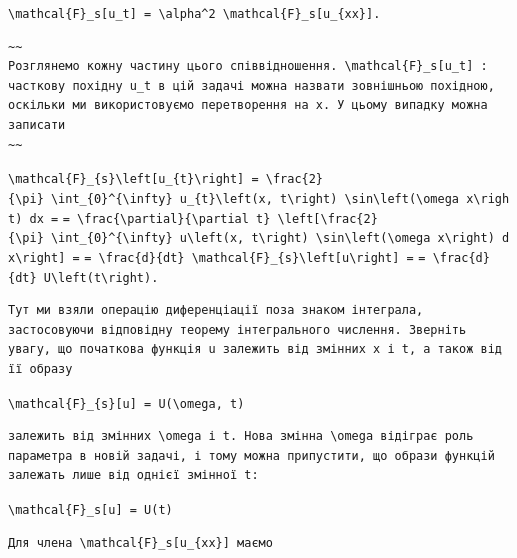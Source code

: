 \documentclass[
  ukrainian,
]{article}
\begin{document}
\texttt{\textbackslash{}mathcal\{F\}\_s{[}u\_t{]}\ =\ \textbackslash{}alpha\^{}2\ \textbackslash{}mathcal\{F\}\_s{[}u\_\{xx\}{]}.}

\begin{verbatim}
~~
Розглянемо кожну частину цього співвідношення. \mathcal{F}_s[u_t] : часткову похідну u_t в цій задачі можна назвати зовнішньою похідною, оскільки ми використовуємо перетворення на x. У цьому випадку можна записати
~~
\end{verbatim}

\texttt{\textbackslash{}mathcal\{F\}\_\{s\}\textbackslash{}left{[}u\_\{t\}\textbackslash{}right{]}\ =\ \textbackslash{}frac\{2\}\{\textbackslash{}pi\}\ \textbackslash{}int\_\{0\}\^{}\{\textbackslash{}infty\}\ u\_\{t\}\textbackslash{}left(x,\ t\textbackslash{}right)\ \textbackslash{}sin\textbackslash{}left(\textbackslash{}omega\ x\textbackslash{}right)\ dx\ =}
\texttt{=\ \textbackslash{}frac\{\textbackslash{}partial\}\{\textbackslash{}partial\ t\}\ \textbackslash{}left{[}\textbackslash{}frac\{2\}\{\textbackslash{}pi\}\ \textbackslash{}int\_\{0\}\^{}\{\textbackslash{}infty\}\ u\textbackslash{}left(x,\ t\textbackslash{}right)\ \textbackslash{}sin\textbackslash{}left(\textbackslash{}omega\ x\textbackslash{}right)\ dx\textbackslash{}right{]}\ =}
\texttt{=\ \textbackslash{}frac\{d\}\{dt\}\ \textbackslash{}mathcal\{F\}\_\{s\}\textbackslash{}left{[}u\textbackslash{}right{]}\ =}
\texttt{=\ \textbackslash{}frac\{d\}\{dt\}\ U\textbackslash{}left(t\textbackslash{}right).}

\begin{verbatim}
Тут ми взяли операцію диференціації поза знаком інтеграла, застосовуючи відповідну теорему інтегрального числення. Зверніть увагу, що початкова функція u залежить від змінних x і t, а також від її образу
\end{verbatim}

\texttt{\textbackslash{}mathcal\{F\}\_\{s\}{[}u{]}\ =\ U(\textbackslash{}omega,\ t)}

\begin{verbatim}
залежить від змінних \omega і t. Нова змінна \omega відіграє роль параметра в новій задачі, і тому можна припустити, що образи функцій залежать лише від однієї змінної t:
\end{verbatim}

\texttt{\textbackslash{}mathcal\{F\}\_s{[}u{]}\ =\ U(t)}

\begin{verbatim}
Для члена \mathcal{F}_s[u_{xx}] маємо
\end{verbatim}
\end{document}

